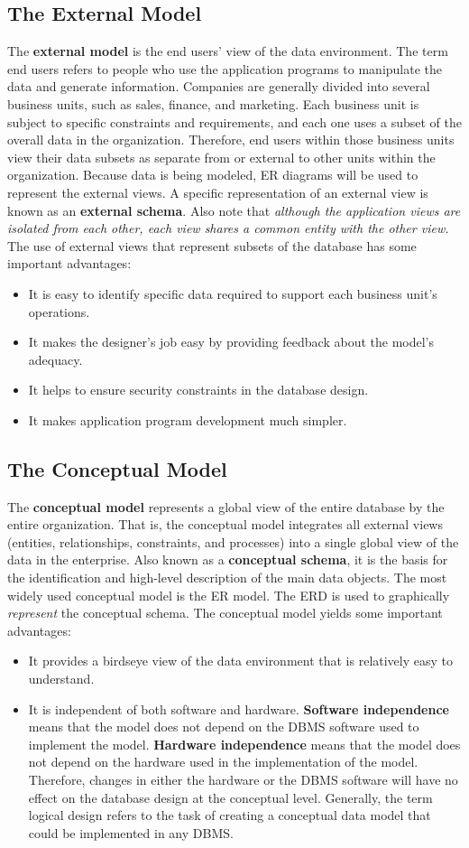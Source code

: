 \documentclass[a4paper, 12pt, titlepage]{report}
\begin{document}
\subsection{The External Model}
The \textbf{external model} is the end users’ view of the data environment. The term end users refers to people who use the application programs to manipulate the data and generate information. Companies are generally divided into several business units, such as sales, finance, and marketing. Each business unit is subject to specific constraints and requirements, and each one uses a subset of the overall data in the organization. Therefore, end users within those business units view their data subsets as separate from or external to other units within the organization. Because data is being modeled, ER diagrams will be used to represent the external views. A specific representation of an external view is known as an \textbf{external schema}. Also note that \emph{although the application views are isolated from each other, each view shares a common entity with the other view.}
The use of external views that represent subsets of the database has some important advantages:
\begin{itemize}
\item It is easy to identify specific data required to support each business unit’s operations.
\item It makes the designer’s job easy by providing feedback about the model’s adequacy.
\item It helps to ensure security constraints in the database design.
\item It makes application program development much simpler.
\end{itemize}
\subsection{The Conceptual Model}
The \textbf{conceptual model} represents a global view of the entire database by the entire organization. That is, the conceptual model integrates all external views (entities, relationships, constraints, and processes) into a single global view of the data in the enterprise. Also known as a \textbf{conceptual schema}, it is the basis for the identification and high-level description of the main data objects. The most widely used conceptual model is the ER model. The ERD is used to graphically \emph{represent} the conceptual schema. The conceptual model yields some important advantages:
\begin{itemize}
\item It provides a birdseye view of the data environment that is relatively easy to understand.
\item It is independent of both software and hardware. \textbf{Software independence} means that the model does not depend on the DBMS software used to implement the model. \textbf{Hardware independence} means that the model does not depend on the hardware used in the implementation of the model. Therefore, changes in either the hardware or the DBMS software will have no effect on the database design at the conceptual level. Generally, the term logical design refers to the task of creating a conceptual data model that could be implemented in any DBMS.
\end{itemize}
\end{document}
